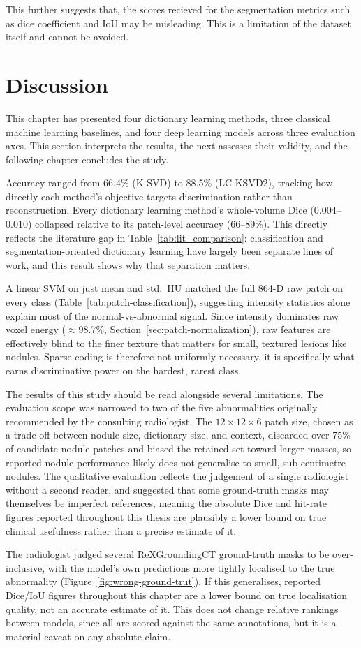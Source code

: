 This further suggests that, the scores recieved for the segmentation metrics such as dice coefficient and IoU may be misleading.
This is a limitation of the dataset itself and cannot be avoided.

\section{Discussion}

This chapter has presented four dictionary learning methods, three classical machine learning baselines, and
four deep learning models across three evaluation axes. This section interprets the results, the next assesses
their validity, and the following chapter concludes the study.

Accuracy ranged from 66.4\% (K-SVD) to 88.5\% (LC-KSVD2), tracking how directly each method's objective
targets discrimination rather than reconstruction.
Every dictionary learning method's whole-volume Dice (0.004--0.010) collapsed relative to its patch-level
accuracy (66--89\%). This directly reflects the
literature gap in Table~\ref{tab:lit_comparison}: classification and segmentation-oriented dictionary
learning have largely been separate lines of work, and this result shows why that separation matters.

A linear SVM on just mean and std.\ HU matched the full 864-D raw patch on every class
(Table~\ref{tab:patch-classification}), suggesting intensity statistics alone explain most of the
normal-vs-abnormal signal. Since
intensity dominates raw voxel energy ($\approx$98.7\%, Section~\ref{sec:patch-normalization}), raw features
are effectively blind to the finer texture that matters for small, textured lesions like nodules. Sparse
coding is therefore not uniformly necessary, it is specifically what earns discriminative power on the
hardest, rarest class.

The results of this study should be read alongside several limitations.
The evaluation scope was narrowed to two of the five abnormalities originally
recommended by the consulting radiologist. The
$12\times12\times6$ patch size, chosen as a trade-off between nodule size, dictionary size, and context,
discarded over 75\% of candidate nodule patches and biased the retained set toward larger masses, so reported
nodule performance likely does not generalise to small, sub-centimetre nodules.
The qualitative evaluation reflects the judgement
of a single radiologist without a second reader, and suggested that
some ground-truth masks may themselves be imperfect references, meaning the absolute Dice and hit-rate figures
reported throughout this thesis are plausibly a lower bound on true clinical usefulness rather than a precise
estimate of it.

The radiologist judged several ReXGroundingCT ground-truth masks to be over-inclusive, with the model's own
predictions more tightly localised to the true abnormality (Figure~\ref{fig:wrong-ground-trut}). If this
generalises, reported Dice/IoU figures throughout this chapter are a lower bound on true localisation quality,
not an accurate estimate of it. This does not change relative rankings between models, since all are scored
against the same annotations, but it is a material caveat on any absolute claim.